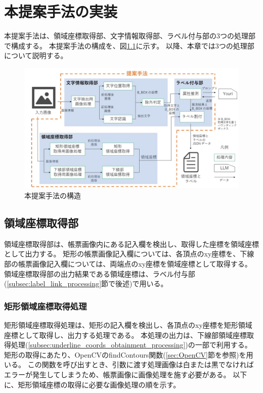 \chapter{本提案手法の実装}\label{cha:Implementation}
本提案手法は、領域座標取得部、文字情報取得部、ラベル付与部の3つの処理部で構成する。
本提案手法の構成を、図\ref{fig:structure}に示す。
以降、本章では3つの処理部について説明する。

\begin{figure}[t]
    \begin{center}
        \includegraphics[width=15cm]{image/structure.jpg}
        \caption{本提案手法の構造}
        \label{fig:structure}
    \end{center}
\end{figure}


\section{領域座標取得部}\label{sec:area_coords_obtainment_part}
領域座標取得部は、帳票画像内にある記入欄を検出し、取得した座標を領域座標として出力する。
矩形の帳票画像記入欄については、各頂点のxy座標を、下線部の帳票画像記入欄については、両端点のxy座標を領域座標として取得する。
領域座標取得部の出力結果である領域座標は、ラベル付与部(\ref{subsec:label_link_processing}節で後述)で用いる。


\subsection{矩形領域座標取得処理}\label{subsec:rect_coords_obtainment_processing}
矩形領域座標取得処理は、矩形の記入欄を検出し、各頂点のxy座標を矩形領域座標として取得し、出力する処理である。
本処理の出力は、下線部領域座標取得処理(\ref{subsec:underline_coords_obtainment_processing})の一部で利用する。
矩形の取得にあたり、OpenCVのfindContours関数(\ref{sec:OpenCV}節を参照)を用いる。
この関数を呼び出すとき、引数に渡す処理画像は白または黒でなければエラーが発生してしまうため、帳票画像に画像処理を施す必要がある。
以下に、矩形領域座標の取得に必要な画像処理の順を示す。

